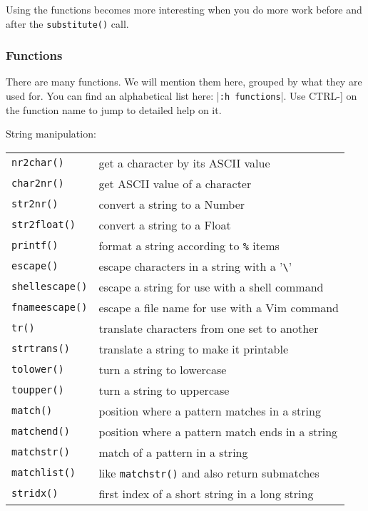Using the functions becomes more interesting when you do more work before and after the \texttt{substitute()} call.

\subsubsection{Functions}
\label{function-list}
There are many functions.
We will mention them here, grouped by what they are used for.
You can find an alphabetical list here: |\texttt{:h functions}|.
Use CTRL-] on the function name to jump to detailed help on it.

String manipulation:
\label{string-functions}
\begin{center} \begin{tabular}{l l}
				\texttt{nr2char()} & get a character by its ASCII value \\
				\texttt{char2nr()} & get ASCII value of a character \\
				\texttt{str2nr()} & convert a string to a Number \\
				\texttt{str2float()} & convert a string to a Float \\
				\texttt{printf()} & format a string according to \texttt{\%} items \\
				\texttt{escape()} & escape characters in a string with a '\texttt{\textbackslash{}}' \\
				\texttt{shellescape()} & escape a string for use with a shell command \\
				\texttt{fnameescape()} & escape a file name for use with a Vim command \\
				\texttt{tr()} & translate characters from one set to another \\
				\texttt{strtrans()} & translate a string to make it printable \\
				\texttt{tolower()} & turn a string to lowercase \\
				\texttt{toupper()} & turn a string to uppercase \\
				\texttt{match()} & position where a pattern matches in a string \\
				\texttt{matchend()} & position where a pattern match ends in a string \\
				\texttt{matchstr()} & match of a pattern in a string \\
				\texttt{matchlist()} & like \texttt{matchstr()} and also return submatches \\
				\texttt{stridx()} & first index of a short string in a long string \\

\end{tabular}
\end{center}
